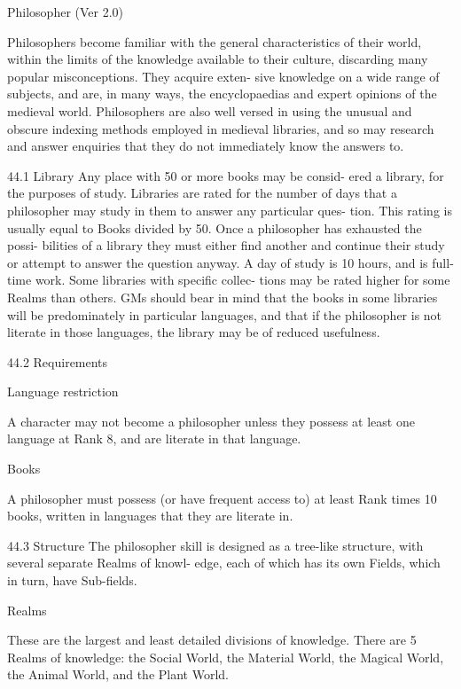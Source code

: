 \begin{Chapter}{Philosopher (Ver 2.0)}

Philosophers  become  familiar  with  the  general 
characteristics  of  their  world,  within  the  limits  of 
the knowledge available to their culture, discarding 
many popular misconceptions. They acquire exten-
sive  knowledge  on  a  wide  range  of  subjects,  and 
are,  in  many  ways,  the  encyclopaedias  and  expert 
opinions  of  the  medieval  world.  Philosophers  are 
also  well  versed  in  using  the  unusual  and  obscure 
indexing  methods  employed  in  medieval  libraries, 
and so may research and answer enquiries that they 
do not immediately know the answers to. 

44.1 Library 
Any  place  with  50  or  more  books  may  be  consid-
ered  a  library,  for  the  purposes  of  study.  Libraries 
are rated for the number of days that a philosopher 
may  study  in  them  to  answer  any  particular  ques-
tion. This rating is usually  equal to Books divided 
by 50. Once a philosopher has exhausted the possi-
bilities  of  a  library  they  must  either  find  another 
and  continue  their  study  or  attempt  to  answer  the 
question anyway. A day of study is 10 hours, and is 
full-time work. Some libraries with specific collec-
tions  may  be  rated  higher  for  some  Realms  than 
others. GMs should bear in mind that the books in 
some  libraries  will  be  predominately  in  particular 
languages, and that if the philosopher is not literate 
in  those  languages,  the  library  may  be  of  reduced 
usefulness. 

44.2 Requirements 

Language restriction 

A  character  may  not  become  a  philosopher  unless 
they  possess  at  least  one  language  at  Rank  8,  and 
are literate in that language. 

Books 

A  philosopher  must  possess  (or  have  frequent 
access to) at least Rank times 10 books, written in 
languages that they are literate in. 

44.3 Structure 
The  philosopher  skill  is  designed  as  a  tree-like 
structure,  with  several  separate  Realms  of  knowl-
edge,  each  of  which  has  its  own  Fields,  which  in 
turn, have Sub-fields. 

Realms 

These are the largest and least detailed divisions of 
knowledge. There are 5 Realms of knowledge: the 
Social  World,  the  Material  World,  the  Magical 
World, the Animal World, and the Plant World. 


\end{Chapter}
